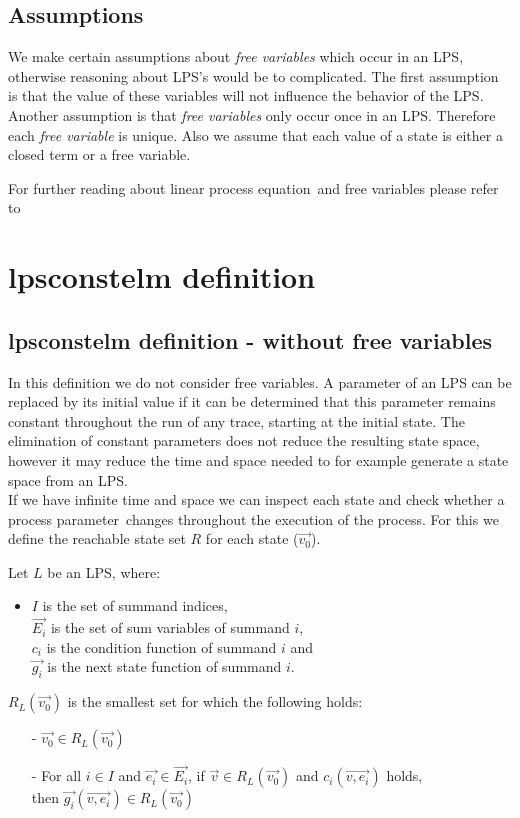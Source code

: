 \index{}\documentclass[a4paper,10pt]{article}
\theoremstyle{plain}
\theoremstyle{definition}
\newcommand{\lps}{linear process equation}
\newcommand{\ovr}{\overrightarrow}
\newcommand{\pp}{process parameter}
\newcommand{\ti}{\textit}
\begin{document}
\subsection{Assumptions}
We make certain assumptions about \ti{free variables} which occur in an LPS, otherwise reasoning about LPS's would be to complicated. The first assumption is that the value of these variables will not influence the behavior of the LPS. Another assumption is that \ti{free variables} only occur once in an LPS. Therefore each \ti{free variable} is unique.
Also we assume that each value of a state is either a closed term or a free variable. 
 
For further reading about \lps\ and free variables please refer to \cite{LPSfreevar} 

\section{lpsconstelm definition}\label{subsec:lpsdef}
\subsection{lpsconstelm definition - without free variables}

In this definition we do not consider free variables.
A parameter of an LPS can be replaced by its initial value if it can be determined that this parameter remains constant throughout the run of any trace, starting at the initial state. The elimination of constant parameters does not reduce the resulting state space, however it may reduce the time and space needed to for example generate a state space from an LPS. \\
If we have infinite time and space we can inspect each state and check whether a \pp\ changes throughout the execution of the process. For this we define the reachable state set $R$ for each state ($\ovr{v_0}$). 

\begin{defn} Let $L$ be an LPS, where: \\ 
\begin{itemize}
\item $I$ is the set of summand indices, \\ $\ovr{E_i}$ is the set of sum variables of summand $i$, \\ $c_i$ is the condition function of summand $i$ and \\ $\ovr{g_i}$ is the next state function of summand $i$.
\end{itemize}

$R_L(\ovr{v_0})$ is the smallest set for which the following holds:
  \begin{itemize}
    \item[-] $\ovr{v_0} \in R_L(\ovr{v_0})$
    \item[-] For all $i \in I$ and $\ovr{e_i} \in \ovr{E_i}$, if $\ovr{v} \in R_L(\ovr{v_0})$ and $c_i(\ovr{v, e_i})$ holds, \\ then $\ovr{g_i}(\ovr{v, e_i}) \in R_L(\ovr{v_0})$ \\
   \end{itemize}
\end{defn}
\end{document}
